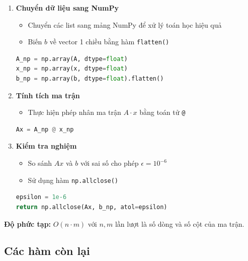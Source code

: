 \documentclass[a4paper,12pt]{report}
\begin{document}
\begin{enumerate}

\item \textbf{Chuyển dữ liệu sang NumPy}

\begin{itemize}
    \item Chuyển các list sang mảng NumPy để xử lý toán học hiệu quả
    \item Biến $b$ về vector 1 chiều bằng hàm \texttt{flatten()}
\end{itemize}

\begin{lstlisting}[language=Python, caption={Chuyển sang NumPy}]
A_np = np.array(A, dtype=float)
x_np = np.array(x, dtype=float)
b_np = np.array(b, dtype=float).flatten()
\end{lstlisting}

\item \textbf{Tính tích ma trận}

\begin{itemize}
    \item Thực hiện phép nhân ma trận $A \cdot x$ bằng toán tử \texttt{@}
\end{itemize}

\begin{lstlisting}[language=Python, caption={Tính Ax}]
Ax = A_np @ x_np
\end{lstlisting}

\item \textbf{Kiểm tra nghiệm}

\begin{itemize}
    \item So sánh $Ax$ và $b$ với sai số cho phép $\epsilon = 10^{-6}$
    \item Sử dụng hàm \texttt{np.allclose()}
\end{itemize}

\begin{lstlisting}[language=Python, caption={Kiểm tra nghiệm}]
epsilon = 1e-6
return np.allclose(Ax, b_np, atol=epsilon)
\end{lstlisting}

\end{enumerate}
\textbf{Độ phức tạp:} $O(n \cdot m)$ với $n, m$ lần lượt là số dòng và số cột của ma trận.

\subsection{Các hàm còn lại}
\end{document}
